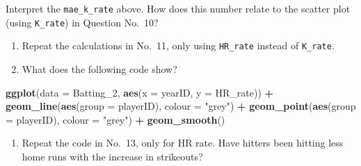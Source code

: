 \documentclass[]{article}
\newenvironment{Shaded}{\begin{snugshade}}{\end{snugshade}}
\newcommand{\DataTypeTok}[1]{\textcolor[rgb]{0.13,0.29,0.53}{#1}}
\newcommand{\DecValTok}[1]{\textcolor[rgb]{0.00,0.00,0.81}{#1}}
\newcommand{\KeywordTok}[1]{\textcolor[rgb]{0.13,0.29,0.53}{\textbf{#1}}}
\newcommand{\NormalTok}[1]{#1}
\newcommand{\OperatorTok}[1]{\textcolor[rgb]{0.81,0.36,0.00}{\textbf{#1}}}
\newcommand{\StringTok}[1]{\textcolor[rgb]{0.31,0.60,0.02}{#1}}
\providecommand{\tightlist}{%
  \setlength{\itemsep}{0pt}\setlength{\parskip}{0pt}}
\begin{document}
\begin{Shaded}
\end{Shaded}

Interpret the \texttt{mae\_k\_rate} above. How does this number relate
to the scatter plot (using \texttt{K\_rate}) in Question No.~10?

\begin{enumerate}
\def\labelenumi{\arabic{enumi}.}
\setcounter{enumi}{11}
\item
  Repeat the calculations in No.~11, only using \texttt{HR\_rate}
  instead of \texttt{K\_rate}.
\item
  What does the following code show?
\end{enumerate}

\begin{Shaded}
\begin{Highlighting}[]
\KeywordTok{ggplot}\NormalTok{(}\DataTypeTok{data =}\NormalTok{ Batting_}\DecValTok{2}\NormalTok{, }\KeywordTok{aes}\NormalTok{(}\DataTypeTok{x =}\NormalTok{ yearID, }\DataTypeTok{y =}\NormalTok{ HR_rate)) }\OperatorTok{+}\StringTok{   }
\StringTok{  }\KeywordTok{geom_line}\NormalTok{(}\KeywordTok{aes}\NormalTok{(}\DataTypeTok{group =}\NormalTok{ playerID), }\DataTypeTok{colour =} \StringTok{"grey"}\NormalTok{) }\OperatorTok{+}\StringTok{ }
\StringTok{  }\KeywordTok{geom_point}\NormalTok{(}\KeywordTok{aes}\NormalTok{(}\DataTypeTok{group =}\NormalTok{ playerID), }\DataTypeTok{colour =} \StringTok{"grey"}\NormalTok{) }\OperatorTok{+}\StringTok{ }
\StringTok{  }\KeywordTok{geom_smooth}\NormalTok{()}
\end{Highlighting}
\end{Shaded}

\begin{enumerate}
\def\labelenumi{\arabic{enumi}.}
\setcounter{enumi}{13}
\tightlist
\item
  Repeat the code in No.~13, only for HR rate. Have hitters been hitting
  less home runs with the increase in strikeouts?
\end{enumerate}
\end{document}
